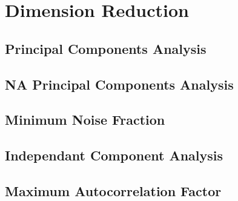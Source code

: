 \chapter{Dimension Reduction}\label{chap:dimred}

\section{Principal Components Analysis}



\section{NA Principal Components Analysis}



\section{Minimum Noise Fraction}



\section{Independant Component Analysis}



\section{Maximum Autocorrelation Factor}




